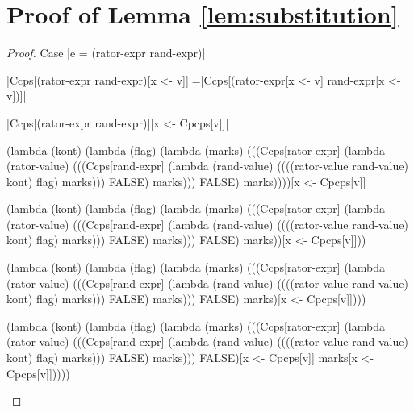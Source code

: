 \appendix
\chapter{Proof of Lemma \ref{lem:substitution}}
\label{app:substitution}

\begin{proof}{Case \scheme|e = (rator-expr rand-expr)|}

\noindent
\scheme|Ccps[(rator-expr rand-expr)[x <- v]]|=\scheme|Ccps[(rator-expr[x <- v] rand-expr[x <- v])]|

\noindent
\scheme|Ccps[(rator-expr rand-expr)][x <- Cpcps[v]]|

\begin{schemeblock}
\begin{schemedisplay}
(lambda (kont)
   (lambda (flag)
     (lambda (marks)
       (((Ccps[rator-expr]
          (lambda (rator-value)
            (((Ccps[rand-expr]
               (lambda (rand-value)
                 ((((rator-value rand-value) kont) flag) marks)))
              FALSE) marks)))
         FALSE) marks))))[x <- Cpcps[v]]
\end{schemedisplay}
\end{schemeblock}

\begin{schemeblock}
\begin{schemedisplay}
(lambda (kont)
   (lambda (flag)
     (lambda (marks)
       (((Ccps[rator-expr]
          (lambda (rator-value)
            (((Ccps[rand-expr]
               (lambda (rand-value)
                 ((((rator-value rand-value) kont) flag) marks)))
              FALSE) marks)))
         FALSE) marks))[x <- Cpcps[v]]))
\end{schemedisplay}
\end{schemeblock}

\begin{schemeblock}
\begin{schemedisplay}
(lambda (kont)
   (lambda (flag)
     (lambda (marks)
       (((Ccps[rator-expr]
          (lambda (rator-value)
            (((Ccps[rand-expr]
               (lambda (rand-value)
                 ((((rator-value rand-value) kont) flag) marks)))
              FALSE) marks)))
         FALSE) marks)[x <- Cpcps[v]])))
\end{schemedisplay}
\end{schemeblock}

\begin{schemeblock}
\begin{schemedisplay}
(lambda (kont)
   (lambda (flag)
     (lambda (marks)
       (((Ccps[rator-expr]
          (lambda (rator-value)
            (((Ccps[rand-expr]
               (lambda (rand-value)
                 ((((rator-value rand-value) kont) flag) marks)))
              FALSE) marks)))
         FALSE)[x <- Cpcps[v]] marks[x <- Cpcps[v]]))))
\end{schemedisplay}
\end{schemeblock}


\end{proof}
